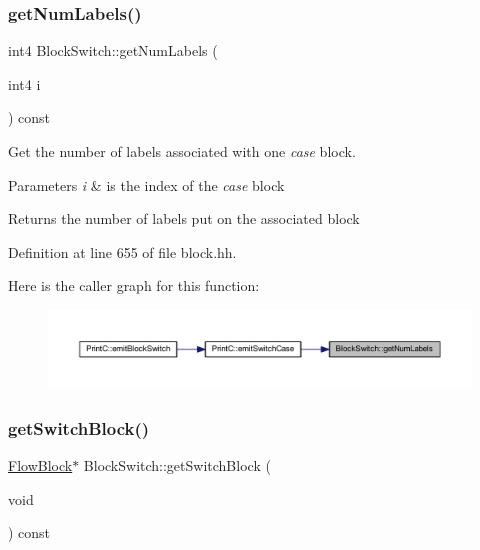 \subsubsection{\texorpdfstring{getNumLabels()}{getNumLabels()}}
{\footnotesize\ttfamily int4 Block\+Switch\+::get\+Num\+Labels (\begin{DoxyParamCaption}\item[{int4}]{i }\end{DoxyParamCaption}) const\hspace{0.3cm}{\ttfamily [inline]}}



Get the number of labels associated with one {\itshape case} block. 


\begin{DoxyParams}{Parameters}
{\em i} & is the index of the {\itshape case} block \\
\hline
\end{DoxyParams}
\begin{DoxyReturn}{Returns}
the number of labels put on the associated block 
\end{DoxyReturn}


Definition at line 655 of file block.\+hh.

Here is the caller graph for this function\+:
\nopagebreak
\begin{figure}[H]
\begin{center}
\leavevmode
\includegraphics[width=350pt]{class_block_switch_af7731cebe7c26c9de45a45b0f821738a_icgraph}
\end{center}
\end{figure}
\mbox{\label{class_block_switch_aa1e2e28b18779bc98c41ec5925d29baf}} 
\subsubsection{\texorpdfstring{getSwitchBlock()}{getSwitchBlock()}}
{\footnotesize\ttfamily \mbox{\hyperlink{class_flow_block}{Flow\+Block}}$\ast$ Block\+Switch\+::get\+Switch\+Block (\begin{DoxyParamCaption}\item[{void}]{ }\end{DoxyParamCaption}) const\hspace{0.3cm}{\ttfamily [inline]}}



